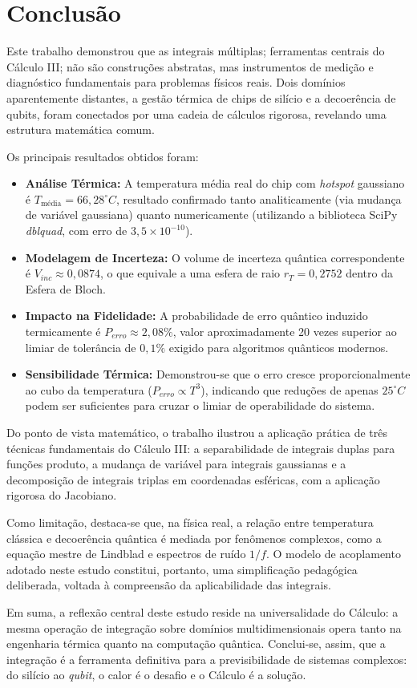 \section{Conclusão}
Este trabalho demonstrou que as integrais múltiplas; ferramentas centrais do Cálculo III; não são construções abstratas, mas instrumentos de medição e diagnóstico fundamentais para problemas físicos reais. Dois domínios aparentemente distantes, a gestão térmica de chips de silício e a decoerência de qubits, foram conectados por uma cadeia de cálculos rigorosa, revelando uma estrutura matemática comum.

Os principais resultados obtidos foram:

\begin{itemize}
    \item \textbf{Análise Térmica:} A temperatura média real do chip com \textit{hotspot} gaussiano é $T_{\text{média}} = 66,28^{\circ}C$, resultado confirmado tanto analiticamente (via mudança de variável gaussiana) quanto numericamente (utilizando a biblioteca SciPy \textit{dblquad}, com erro de $3,5 \times 10^{-10}$).
    \item \textbf{Modelagem de Incerteza:} O volume de incerteza quântica correspondente é $V_{inc} \approx 0,0874$, o que equivale a uma esfera de raio $r_T = 0,2752$ dentro da Esfera de Bloch.
    \item \textbf{Impacto na Fidelidade:} A probabilidade de erro quântico induzido termicamente é $P_{erro} \approx 2,08\%$, valor aproximadamente 20 vezes superior ao limiar de tolerância de $0,1\%$ exigido para algoritmos quânticos modernos.
    \item \textbf{Sensibilidade Térmica:} Demonstrou-se que o erro cresce proporcionalmente ao cubo da temperatura ($P_{erro} \propto T^3$), indicando que reduções de apenas $25^{\circ}C$ podem ser suficientes para cruzar o limiar de operabilidade do sistema.
\end{itemize}

Do ponto de vista matemático, o trabalho ilustrou a aplicação prática de três técnicas fundamentais do Cálculo III: a separabilidade de integrais duplas para funções produto, a mudança de variável para integrais gaussianas e a decomposição de integrais triplas em coordenadas esféricas, com a aplicação rigorosa do Jacobiano.

Como limitação, destaca-se que, na física real, a relação entre temperatura clássica e decoerência quântica é mediada por fenômenos complexos, como a equação mestre de Lindblad e espectros de ruído $1/f$. O modelo de acoplamento adotado neste estudo constitui, portanto, uma simplificação pedagógica deliberada, voltada à compreensão da aplicabilidade das integrais.

Em suma, a reflexão central deste estudo reside na universalidade do Cálculo: a mesma operação de integração sobre domínios multidimensionais opera tanto na engenharia térmica quanto na computação quântica. Conclui-se, assim, que a integração é a ferramenta definitiva para a previsibilidade de sistemas complexos: do silício ao \textit{qubit}, o calor é o desafio e o Cálculo é a solução.